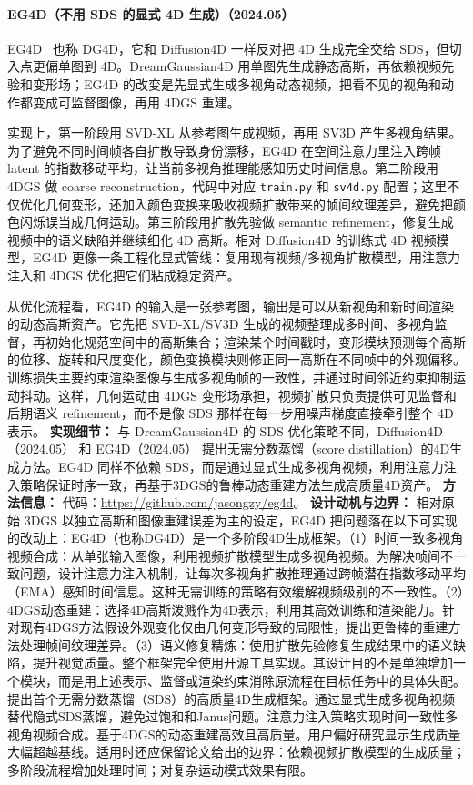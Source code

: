 \paragraph{EG4D（不用 SDS 的显式 4D 生成）（2024.05）}
EG4D~\cite{2405_18132} 也称 DG4D，它和 Diffusion4D 一样反对把 4D 生成完全交给 SDS，但切入点更偏单图到 4D。DreamGaussian4D 用单图先生成静态高斯，再依赖视频先验和变形场；EG4D 的改变是先显式生成多视角动态视频，把看不见的视角和动作都变成可监督图像，再用 4DGS 重建。

实现上，第一阶段用 SVD-XL 从参考图生成视频，再用 SV3D 产生多视角结果。为了避免不同时间帧各自扩散导致身份漂移，EG4D 在空间注意力里注入跨帧 latent 的指数移动平均，让当前多视角推理能感知历史时间信息。第二阶段用 4DGS 做 coarse reconstruction，代码中对应 \texttt{train.py} 和 \texttt{sv4d.py} 配置；这里不仅优化几何变形，还加入颜色变换来吸收视频扩散带来的帧间纹理差异，避免把颜色闪烁误当成几何运动。第三阶段用扩散先验做 semantic refinement，修复生成视频中的语义缺陷并继续细化 4D 高斯。相对 Diffusion4D 的训练式 4D 视频模型，EG4D 更像一条工程化显式管线：复用现有视频/多视角扩散模型，用注意力注入和 4DGS 优化把它们粘成稳定资产。

从优化流程看，EG4D 的输入是一张参考图，输出是可以从新视角和新时间渲染的动态高斯资产。它先把 SVD-XL/SV3D 生成的视频整理成多时间、多视角监督，再初始化规范空间中的高斯集合；渲染某个时间戳时，变形模块预测每个高斯的位移、旋转和尺度变化，颜色变换模块则修正同一高斯在不同帧中的外观偏移。训练损失主要约束渲染图像与生成多视角帧的一致性，并通过时间邻近约束抑制运动抖动。这样，几何运动由 4DGS 变形场承担，视频扩散只负责提供可见监督和后期语义 refinement，而不是像 SDS 那样在每一步用噪声梯度直接牵引整个 4D 表示。
\textbf{实现细节：} 与 DreamGaussian4D 的 SDS 优化策略不同，Diffusion4D（2024.05） 和 EG4D（2024.05） 提出无需分数蒸馏（score distillation）的4D生成方法。EG4D 同样不依赖 SDS，而是通过显式生成多视角视频，利用注意力注入策略保证时序一致，再基于3DGS的鲁棒动态重建方法生成高质量4D资产。
\textbf{方法信息：} 代码：\url{https://github.com/jasongzy/eg4d}。
\textbf{设计动机与边界：} 相对原始 3DGS 以独立高斯和图像重建误差为主的设定，EG4D 把问题落在以下可实现的改动上：EG4D（也称DG4D）是一个多阶段4D生成框架。（1）时间一致多视角视频合成：从单张输入图像，利用视频扩散模型生成多视角视频。为解决帧间不一致问题，设计注意力注入机制，让每次多视角扩散推理通过跨帧潜在指数移动平均（EMA）感知时间信息。这种无需训练的策略有效缓解视频级别的不一致性。（2）4DGS动态重建：选择4D高斯泼溅作为4D表示，利用其高效训练和渲染能力。针对现有4DGS方法假设外观变化仅由几何变形导致的局限性，提出更鲁棒的重建方法处理帧间纹理差异。（3）语义修复精炼：使用扩散先验修复生成结果中的语义缺陷，提升视觉质量。整个框架完全使用开源工具实现。其设计目的不是单独增加一个模块，而是用上述表示、监督或渲染约束消除原流程在目标任务中的具体失配。提出首个无需分数蒸馏（SDS）的高质量4D生成框架。通过显式生成多视角视频替代隐式SDS蒸馏，避免过饱和和Janus问题。注意力注入策略实现时间一致性多视角视频合成。基于4DGS的动态重建高效且高质量。用户偏好研究显示生成质量大幅超越基线。适用时还应保留论文给出的边界：依赖视频扩散模型的生成质量；多阶段流程增加处理时间；对复杂运动模式效果有限。
